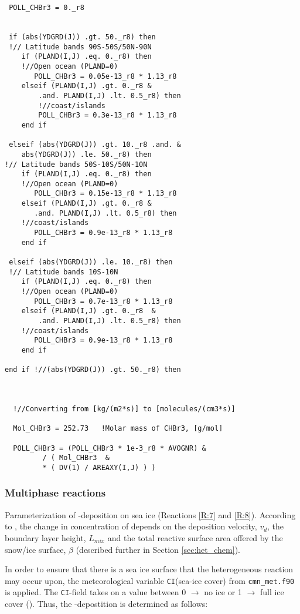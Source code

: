 \begin{lstlisting}
 POLL_CHBr3 = 0._r8

 
 if (abs(YDGRD(J)) .gt. 50._r8) then
 !// Latitude bands 90S-50S/50N-90N
    if (PLAND(I,J) .eq. 0._r8) then   
    !//Open ocean (PLAND=0)
       POLL_CHBr3 = 0.05e-13_r8 * 1.13_r8
    elseif (PLAND(I,J) .gt. 0._r8 &
        .and. PLAND(I,J) .lt. 0.5_r8) then
        !//coast/islands
        POLL_CHBr3 = 0.3e-13_r8 * 1.13_r8
    end if

 elseif (abs(YDGRD(J)) .gt. 10._r8 .and. &
    abs(YDGRD(J)) .le. 50._r8) then 
!// Latitude bands 50S-10S/50N-10N
    if (PLAND(I,J) .eq. 0._r8) then   
    !//Open ocean (PLAND=0)
       POLL_CHBr3 = 0.15e-13_r8 * 1.13_r8
    elseif (PLAND(I,J) .gt. 0._r8 &
       .and. PLAND(I,J) .lt. 0.5_r8) then
    !//coast/islands
       POLL_CHBr3 = 0.9e-13_r8 * 1.13_r8
    end if

 elseif (abs(YDGRD(J)) .le. 10._r8) then
 !// Latitude bands 10S-10N
    if (PLAND(I,J) .eq. 0._r8) then   
    !//Open ocean (PLAND=0)
       POLL_CHBr3 = 0.7e-13_r8 * 1.13_r8
    elseif (PLAND(I,J) .gt. 0._r8  & 
        .and. PLAND(I,J) .lt. 0.5_r8) then
    !//coast/islands
       POLL_CHBr3 = 0.9e-13_r8 * 1.13_r8
    end if

end if !//(abs(YDGRD(J)) .gt. 50._r8) then 



  !//Converting from [kg/(m2*s)] to [molecules/(cm3*s)]

  Mol_CHBr3 = 252.73   !Molar mass of CHBr3, [g/mol]

  POLL_CHBr3 = (POLL_CHBr3 * 1e-3_r8 * AVOGNR) &
         / ( Mol_CHBr3  &
         * ( DV(1) / AREAXY(I,J) ) )

\end{lstlisting}

\subsubsection{Multiphase reactions}\label{sec:impl_multiphase_react}

Parameterization of -deposition on sea ice (Reactions \ref{R:7} and \ref{R:8}). According to \cite{CAO}, the change in concentration of  depends on the deposition velocity, $v_d$, the boundary layer height, $L_{mix}$ and the total reactive surface area offered by the snow/ice surface, $\beta$ (described further in Section \ref{sec:het_chem}). 

\medskip 

In order to ensure that there is a sea ice surface that the heterogeneous reaction may occur upon, the meteorological variable \texttt{CI}(sea-ice cover) from \texttt{cmn\_met.f90} is applied. The \texttt{CI}-field takes on a value between 0 $\rightarrow$ no ice or 1 $\rightarrow$ full ice cover (\cite{SovdeManual}). Thus, the -depostition is determined as follows: 

